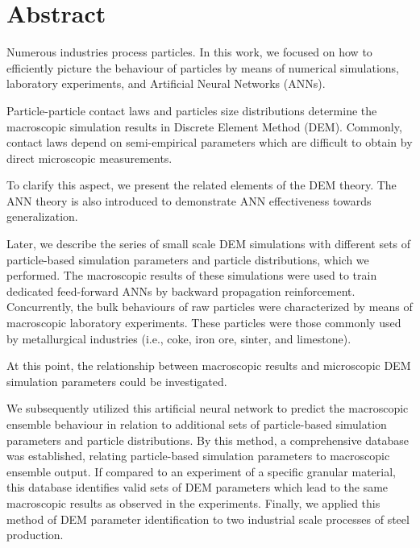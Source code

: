 \chapter*{Abstract}
\label{cap:abstract}

Numerous industries process particles.
In this work, we focused on how to efficiently picture the behaviour of
particles by means of numerical simulations, laboratory experiments, 
and Artificial Neural Networks (ANNs).

Particle-particle contact laws and particles size distributions determine the
macroscopic simulation results in Discrete Element Method (DEM). 
Commonly, contact laws depend on semi-empirical parameters which 
are difficult to obtain by direct microscopic measurements. 

To clarify this aspect, we present the related elements of the DEM
theory.
The ANN theory is also introduced to demonstrate ANN effectiveness towards
generalization.

Later, we describe the series of small scale DEM simulations with different sets
of particle-based simulation parameters and particle distributions, which we
performed.
The macroscopic results of these simulations were used to train dedicated
feed-forward ANNs by backward propagation reinforcement.
Concurrently, the bulk behaviours of raw particles were characterized by means
of macroscopic laboratory experiments. These particles were those commonly used
by metallurgical industries (i.e., coke, iron ore, sinter, and limestone).

At this point, the relationship between macroscopic results and microscopic DEM
simulation parameters could be investigated.

We subsequently utilized this artificial neural network to predict the
macroscopic ensemble behaviour in relation to additional sets of particle-based simulation parameters and particle distributions. 
By this method, a comprehensive database was established, relating particle-based 
simulation parameters to macroscopic ensemble output.
If compared to an experiment of a specific granular material, this database identifies 
valid sets of DEM parameters which lead to the same macroscopic results as observed in the experiments.
Finally, we applied this method of DEM parameter identification to two industrial
scale processes of steel production.
